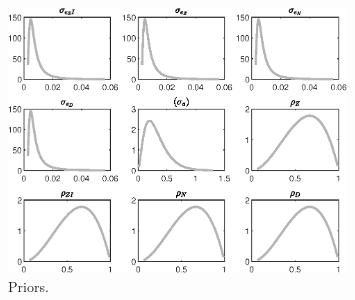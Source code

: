  
\begin{figure}[H]
\centering
\includegraphics[width=0.80\textwidth]{BRS_extended_fd/graphs/BRS_extended_fd_Priors1}
\caption{Priors.}\label{Fig:Priors:1}
\end{figure}
 
